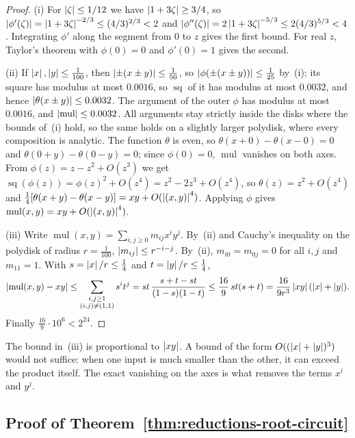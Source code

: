 \begin{proof}
(i) For $\left\lvert\zeta\right\rvert\le1/12$ we have $\left\lvert1+3\zeta\right\rvert\ge3/4$, so
$\left\lvert\phi'(\zeta)\right\rvert=\left\lvert1+3\zeta\right\rvert^{-2/3}\le(4/3)^{2/3}<2$ and
$\left\lvert\phi''(\zeta)\right\rvert=2\left\lvert1+3\zeta\right\rvert^{-5/3}\le2(4/3)^{5/3}<4$. Integrating
$\phi'$ along the segment from $0$ to $z$ gives the first bound. For real $z$,
Taylor's theorem with $\phi(0)=0$ and $\phi'(0)=1$ gives the second.

(ii) If $\left\lvert x\right\rvert,\left\lvert y\right\rvert\le\frac1{100}$, then $\left\lvert\pm(x\pm y)\right\rvert\le\frac1{50}$, so
$\left\lvert\phi(\pm(x\pm y))\right\rvert\le\frac1{25}$ by~(i); its square has modulus at most
$0.0016$, so $\operatorname{sq}$ of it has modulus at most $0.0032$, and hence
$\left\lvert\theta(x\pm y)\right\rvert\le0.0032$. The argument of the outer $\phi$ has modulus at
most $0.0016$, and $\left\lvert\operatorname{mul}\right\rvert\le0.0032$. All arguments stay
strictly inside the disks where the bounds of~(i) hold, so the same holds on a
slightly larger polydisk, where every composition is analytic. The function
$\theta$ is even, so $\theta(x+0)-\theta(x-0)=0$ and $\theta(0+y)-\theta(0-y)=0$;
since $\phi(0)=0$, $\operatorname{mul}$ vanishes on both axes. From
$\phi(z)=z-z^2+O(z^3)$ we get $\operatorname{sq}(\phi(z))=\phi(z)^2+O(z^4)
=z^2-2z^3+O(z^4)$, so $\theta(z)=z^2+O(z^4)$ and
$\frac14[\theta(x+y)-\theta(x-y)]=xy+O(\left\lvert(x,y)\right\rvert^4)$. Applying $\phi$ gives
$\operatorname{mul}(x,y)=xy+O(\left\lvert(x,y)\right\rvert^4)$.

(iii) Write $\operatorname{mul}(x,y)=\sum_{i,j\ge0}m_{ij}x^iy^j$. By~(ii) and
Cauchy's inequality on the polydisk of radius $r=\frac1{100}$,
$\left\lvert m_{ij}\right\rvert\le r^{-i-j}$. By~(ii), $m_{i0}=m_{0j}=0$ for all $i,j$ and
$m_{11}=1$. With $s=\left\lvert x\right\rvert/r\le\frac14$ and $t=\left\lvert y\right\rvert/r\le\frac14$,
\[
 \left\lvert\operatorname{mul}(x,y)-xy\right\rvert\le\sum_{\substack{i,j\ge1\\(i,j)\ne(1,1)}}s^it^j
 =st\,\frac{s+t-st}{(1-s)(1-t)}\le\frac{16}9\,st(s+t)
 =\frac{16}{9r^3}\left\lvert xy\right\rvert(\left\lvert x\right\rvert+\left\lvert y\right\rvert).
\]
Finally $\frac{16}{9}\cdot10^6<2^{24}$.
\end{proof}

The bound in~(iii) is proportional to $\left\lvert xy\right\rvert$. A bound of the form
$O((\left\lvert x\right\rvert+\left\lvert y\right\rvert)^3)$ would not suffice: when one input is much smaller than
the other, it can exceed the product itself. The exact vanishing on the axes
is what removes the terms $x^i$ and $y^j$.

\subsection{Proof of Theorem~\ref{thm:reductions-root-circuit}}
\label{app:reductions-root-compiler}

